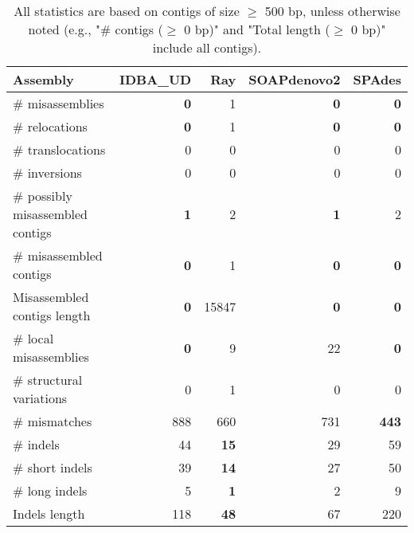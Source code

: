 \documentclass[12pt,a4paper]{article}
\begin{document}
\begin{table}[ht]
\begin{center}
\caption{All statistics are based on contigs of size $\geq$ 500 bp, unless otherwise noted (e.g., "\# contigs ($\geq$ 0 bp)" and "Total length ($\geq$ 0 bp)" include all contigs).}
\begin{tabular}{|l*{4}{|r}|}
\hline
Assembly & IDBA\_UD & Ray & SOAPdenovo2 & SPAdes \\ \hline
\# misassemblies & {\bf 0} & 1 & {\bf 0} & {\bf 0} \\ \hline
\hspace{5mm}\# relocations & {\bf 0} & 1 & {\bf 0} & {\bf 0} \\ \hline
\hspace{5mm}\# translocations & 0 & 0 & 0 & 0 \\ \hline
\hspace{5mm}\# inversions & 0 & 0 & 0 & 0 \\ \hline
\# possibly misassembled contigs & {\bf 1} & 2 & {\bf 1} & 2 \\ \hline
\# misassembled contigs & {\bf 0} & 1 & {\bf 0} & {\bf 0} \\ \hline
Misassembled contigs length & {\bf 0} & 15847 & {\bf 0} & {\bf 0} \\ \hline
\# local misassemblies & {\bf 0} & 9 & 22 & {\bf 0} \\ \hline
\# structural variations & 0 & 1 & 0 & 0 \\ \hline
\# mismatches & 888 & 660 & 731 & {\bf 443} \\ \hline
\# indels & 44 & {\bf 15} & 29 & 59 \\ \hline
\hspace{5mm}\# short indels & 39 & {\bf 14} & 27 & 50 \\ \hline
\hspace{5mm}\# long indels & 5 & {\bf 1} & 2 & 9 \\ \hline
Indels length & 118 & {\bf 48} & 67 & 220 \\ \hline
\end{tabular}
\end{center}
\end{table}
\end{document}
